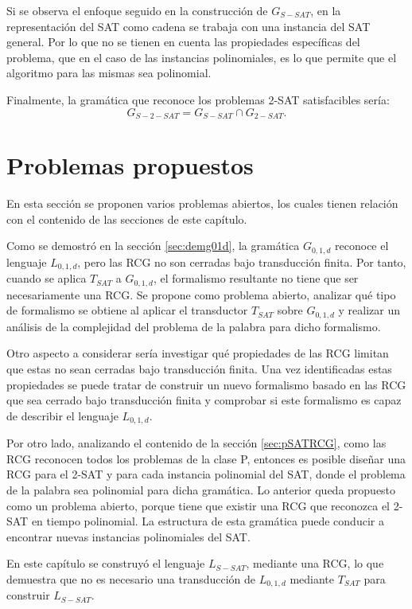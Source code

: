 \documentclass[12pt]{article}
\begin{document}
Si se observa el enfoque seguido en la construcción de $G_{S-SAT}$, en la representación del SAT como cadena se trabaja con una instancia del SAT general. Por lo que no se tienen en cuenta las propiedades específicas del problema, que en el caso de las instancias polinomiales, es lo que permite que el algoritmo para las mismas sea polinomial.

Finalmente, la gramática que reconoce los problemas 2-SAT satisfacibles sería:
$$G_{S-2-SAT}=G_{S-SAT}\cap G_{2-SAT}.$$

\section{Problemas propuestos}


En esta sección se proponen varios problemas abiertos, los cuales tienen relación con el contenido de las secciones
de este capítulo.

Como se demostró en la sección \ref{sec:demg01d}, la gramática $G_{0,1,d}$ reconoce el lenguaje $L_{0,1,d}$, pero las RCG no son cerradas bajo transducción finita. Por tanto, cuando se aplica $T_{SAT}$ a $G_{0,1,d}$, el formalismo resultante no tiene que ser necesariamente una RCG. Se propone como problema abierto, analizar qué tipo de formalismo se obtiene al aplicar el transductor $T_{SAT}$ sobre $G_{0,1,d}$ y realizar un análisis de la complejidad del problema de la palabra para dicho formalismo.

Otro aspecto a considerar sería investigar qué propiedades de las RCG limitan que estas no sean cerradas bajo transducción finita.  Una vez identificadas estas propiedades se puede tratar de construir un nuevo formalismo basado en las RCG que sea cerrado bajo transducción finita y comprobar si este formalismo es capaz de describir el lenguaje $L_{0,1,d}$.

Por otro lado, analizando el contenido de la sección \ref{sec:pSATRCG}, como las RCG reconocen todos los problemas de la clase P, entonces es posible diseñar una RCG para el 2-SAT y para cada instancia polinomial del SAT, donde el problema de la palabra sea polinomial para dicha gramática.  Lo anterior queda propuesto como un problema abierto, porque tiene que existir una RCG que reconozca el 2-SAT en tiempo polinomial. La estructura de esta gramática puede conducir a encontrar nuevas instancias polinomiales del SAT.

En este capítulo se construyó el lenguaje $L_{S-SAT}$, mediante una RCG, lo que demuestra que no es necesario una transducción de $L_{0,1,d}$ mediante $T_{SAT}$ para construir $L_{S-SAT}$.
\end{document}
